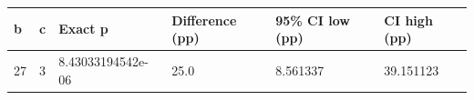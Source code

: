 \begin{tabular}{llllll}
\hline
b & c & Exact p & Difference (pp) & 95\% CI low (pp) & CI high (pp) \\
\hline
27 & 3 & 8.43033194542e-06 & 25.0 & 8.561337 & 39.151123 \\
\hline
\end{tabular}
